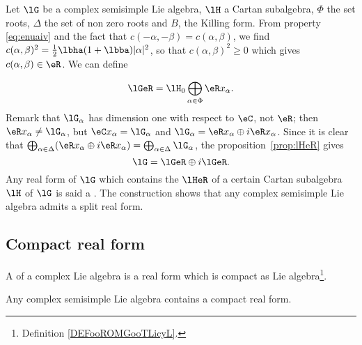 Let $\lG$ be a complex semisimple Lie algebra, $\lH$ a Cartan subalgebra, $\Phi$ the set roots, $\Delta$ the set of non zero roots and $B$, the Killing form. From property \eqref{eq:enuaiv} and the fact that $c(-\alpha,-\beta)=c(\alpha,\beta)$, we find $c(\alpha,\beta)^2=\frac{1}{2}\lbha(1+\lbba)|\alpha|^2$,
 so that $c(\alpha,\beta)^2\geq 0$ which gives $c(\alpha,\beta)\in\eR$. We can define

\[
   \lGeR=\lH_0\bigoplus_{\alpha\in\Phi}\eR x_{\alpha}.
\]
Remark that $\lG_{\alpha}$ has dimension one with respect to $\eC$, not $\eR$; then $\eR x_{\alpha}\neq\lG_{\alpha}$, but $\eC x_{\alpha}=\lG_{\alpha}$ and $\lG_{\alpha}=\eR x_{\alpha}\oplus i\eR x_{\alpha}$. Since it is clear that $\bigoplus_{\alpha\in\Delta}( \eR x_{\alpha}\oplus i\eR x_{\alpha} )=\bigoplus_{\alpha\in\Delta}\lG_{\alpha}$, the proposition~\ref{prop:lHeR} gives
\begin{equation}
  \lG=\lGeR\oplus i\lGeR.
\end{equation}
Any real form of $\lG$ which contains the $\lHeR$ of a certain Cartan subalgebra $\lH$ of $\lG$ is said a . The construction shows that any complex semisimple Lie algebra admits a split real form.

\subsection{Compact real form}

\begin{definition}
    A  of a complex Lie algebra is a real form which is compact as Lie algebra\footnote{Definition \ref{DEFooROMGooTLicyL}.}. 
\end{definition}

\begin{theorem}
Any complex semisimple Lie algebra contains a compact real form.
\end{theorem}

